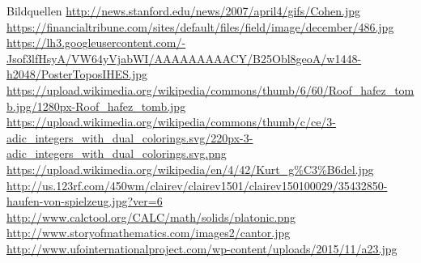 \documentclass[12pt,compress,ngerman,utf8,t]{beamer}
\begin{document}
\begin{frame}[fragile]{Bildquellen}
  \tiny
  \url{http://news.stanford.edu/news/2007/april4/gifs/Cohen.jpg} \\
  \url{https://financialtribune.com/sites/default/files/field/image/december/486.jpg} \\
  \url{https://lh3.googleusercontent.com/-Jsof3lfHsyA/VW64yVjabWI/AAAAAAAAACY/B25Obl8geoA/w1448-h2048/PosterToposIHES.jpg} \\
  \url{https://upload.wikimedia.org/wikipedia/commons/thumb/6/60/Roof_hafez_tomb.jpg/1280px-Roof_hafez_tomb.jpg} \\
  \url{https://upload.wikimedia.org/wikipedia/commons/thumb/c/ce/3-adic_integers_with_dual_colorings.svg/220px-3-adic_integers_with_dual_colorings.svg.png} \\
  \url{https://upload.wikimedia.org/wikipedia/en/4/42/Kurt_g%C3%B6del.jpg} \\
  \url{http://us.123rf.com/450wm/clairev/clairev1501/clairev150100029/35432850-haufen-von-spielzeug.jpg?ver=6} \\
  \url{http://www.calctool.org/CALC/math/solids/platonic.png} \\
  \url{http://www.storyofmathematics.com/images2/cantor.jpg} \\
  \url{http://www.ufointernationalproject.com/wp-content/uploads/2015/11/a23.jpg}
  \par
\end{frame}
\addtocounter{framenumber}{-1}
\end{document}
